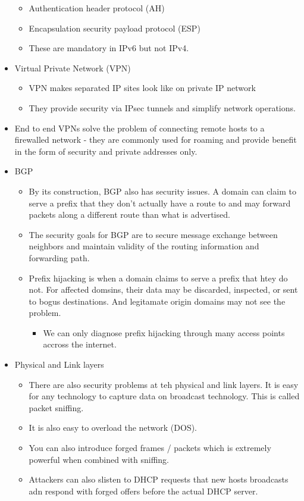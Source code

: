 \documentclass[]{article}
\providecommand{\tightlist}{%
  \setlength{\itemsep}{0pt}\setlength{\parskip}{0pt}}
\begin{document}
\begin{itemize}
  \begin{itemize}
  \tightlist
  \item
    Authentication header protocol (AH)
  \item
    Encapsulation security payload protocol (ESP)
  \item
    These are mandatory in IPv6 but not IPv4.
  \end{itemize}
\item
  Virtual Private Network (VPN)

  \begin{itemize}
  \tightlist
  \item
    VPN makes separated IP sites look like on private IP network
  \item
    They provide security via IPsec tunnels and simplify network
    operations.
  \end{itemize}
\item
  End to end VPNs solve the problem of connecting remote hosts to a
  firewalled network - they are commonly used for roaming and provide
  benefit in the form of security and private addresses only.
\item
  BGP

  \begin{itemize}
  \tightlist
  \item
    By its construction, BGP also has security issues. A domain can
    claim to serve a prefix that they don't actually have a route to and
    may forward packets along a different route than what is advertised.
  \item
    The security goals for BGP are to secure message exchange between
    neighbors and maintain validity of the routing information and
    forwarding path.
  \item
    Prefix hijacking is when a domain claims to serve a prefix that htey
    do not. For affected domsins, their data may be discarded,
    inspected, or sent to bogus destinations. And legitamate origin
    domains may not see the problem.

    \begin{itemize}
    \tightlist
    \item
      We can only diagnose prefix hijacking through many access points
      accross the internet.
    \end{itemize}
  \end{itemize}
\item
  Physical and Link layers

  \begin{itemize}
  \tightlist
  \item
    There are also security problems at teh physical and link layers. It
    is easy for any technology to capture data on broadcast technology.
    This is called packet sniffing.
  \item
    It is also easy to overload the network (DOS).
  \item
    You can also introduce forged frames / packets which is extremely
    powerful when combined with sniffing.
  \item
    Attackers can also slisten to DHCP requests that new hosts
    broadcasts adn respond with forged offers before the actual DHCP
    server.


\end{itemize}
\end{itemize}
\end{document}
